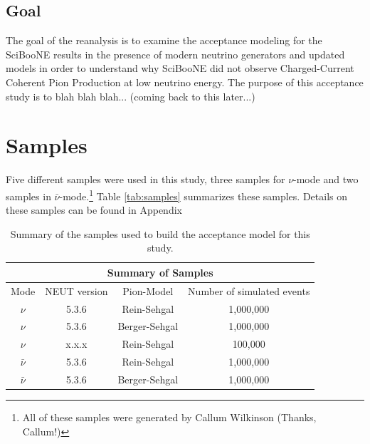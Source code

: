 \documentclass[11pt]{article}
\begin{document}
\subsection{Goal}\label{sec:goals}
The goal of the reanalysis is to examine the acceptance modeling for the SciBooNE results in the presence of modern neutrino generators and updated models in order to understand why SciBooNE did not observe Charged-Current Coherent Pion Production at low neutrino energy. The purpose of this acceptance study is to blah blah blah... (coming back to this later...)



\section{Samples}\label{sec:samples}
Five different samples were used in this study, three samples for $\nu$-mode and two samples in $\bar{\nu}$-mode.\footnote{All of these samples were generated by Callum Wilkinson (Thanks, Callum!)} Table \ref{tab:samples} summarizes these samples. Details on these samples can be found in Appendix

\begin{center}
\begin{table}[htb]
	\begin{center}
	\begin{tabular}{c|c|c|c}
	\multicolumn{4}{c}{\textbf{Summary of Samples}} \\
	\hline \hline
	 Mode & NEUT version & Pion-Model & Number of simulated events\\
	\hline
	 $\nu$ & 5.3.6 & Rein-Sehgal & 1,000,000 \\
	\hline
	$\nu$ & 5.3.6 & Berger-Sehgal & 1,000,000 \\
	\hline
	$\nu$ & x.x.x & Rein-Sehgal & 100,000 \\
	\hline
	 $\bar{\nu}$ & 5.3.6 & Rein-Sehgal & 1,000,000 \\
	\hline
	$\bar{\nu}$ & 5.3.6 & Berger-Sehgal & 1,000,000 \\
	\hline
	\end{tabular}%
	\caption{Summary of the samples used to build the acceptance model for this study.} 
	\end{center}
\end{table}\label{tab:samples}
\end{center}
\end{document}
